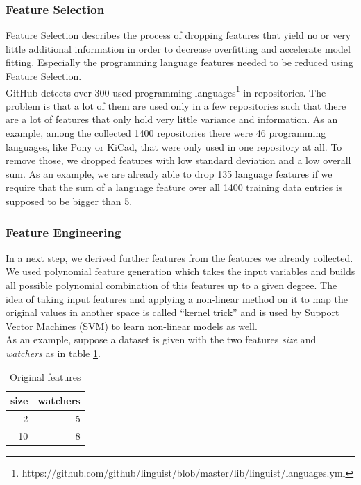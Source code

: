 \documentclass[a4paper,12pt]{article}
\begin{document}
\subsubsection{Feature Selection}\label{feature-selection}

Feature Selection describes the process of dropping features that yield
no or very little additional information in order to decrease
overfitting and accelerate model fitting. Especially the programming
language features needed to be reduced using Feature Selection.\\
GitHub detects over 300 used programming languages\footnote{https://github.com/github/linguist/blob/master/lib/linguist/languages.yml} in repositories.
The problem is that a lot of them are used only in a few repositories such that there are a lot of features that only hold very little variance and information.
As an example, among the collected 1400 repositories there were 46 programming languages, like Pony or KiCad, that were only used in one repository at all.
To remove those, we dropped features with low standard deviation and a low overall sum. As an example, we are already able to drop 135 language features if we require that the sum of a language feature over all 1400 training data entries is supposed to be bigger than 5.

\subsubsection{Feature Engineering}\label{feature-engineering}

In a next step, we derived further features from the features we already
collected. We used polynomial feature generation which takes the input
variables and builds all possible polynomial combination of this
features up to a given degree. The idea of taking input features and
applying a non-linear method on it to map the original values in another
space is called ``kernel trick'' and is used by Support Vector Machines
(SVM) to learn non-linear models as well.\\
As an example, suppose a dataset is given with the two features
\textit{size} and \textit{watchers} as in table \ref{example-feature-engineering-basic}.

\begin{table}[]
\label{example-feature-engineering-basic}
\centering
\caption{Original features}
\begin{tabular}{|r|r|}
\hline
size & watchers \\ \hline
2    & 5        \\ \hline
10   & 8        \\ \hline
\end{tabular}
\end{table}
\end{document}
